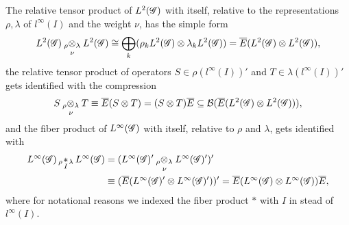 The relative tensor product of $L^{2}(\mathscr{G})$ with itself, relative to the
representations $\rho,\lambda$ of $l^{\infty}(I)$ and the weight
$\nu$, has the simple form
\begin{align*}
L^{2}(\mathscr{G}) \underset{\nu{}}{_{\rho}\otimes_{\lambda}} L^{2}(\mathscr{G}) \cong
  \bigoplus_{k} (\rho_{k}L^{2}(\mathscr{G}) \otimes \lambda_{k}L^{2}(\mathscr{G})) =
  \overline{E}(L^{2}(\mathscr{G}) \otimes L^{2}(\mathscr{G})),
\end{align*}
the relative tensor product of operators $S\in \rho(l^{\infty}(I))'$
and $T \in \lambda(l^{\infty}(I))'$ gets identified with the
compression
\begin{align*}
S \underset{\nu{}}{_{\rho}\otimes_{\lambda}} T \equiv
  \overline{E}(S \otimes
  T) = (S \otimes T)\overline{E} \subseteq {\cal B}(\overline{E}(L^{2}(\mathscr{G})
  \otimes L^{2}(\mathscr{G}))),
\end{align*}
and the fiber product of  $  L^{\infty}(\mathscr{G})$ with itself, relative to $\rho$
and $\lambda$,  gets identified with
\begin{align} \label{eq:vn-fiber}
  \begin{aligned}
    L^{\infty}(\mathscr{G}) \,{}_{\rho}\!\underset{I}{\ast}\,\!\!_{\lambda}\, L^{\infty}(\mathscr{G}) &= (L^{\infty}(\mathscr{G})' \underset{\nu{}}{_{\rho}\otimes_{\lambda}} L^{\infty}(\mathscr{G})')' \\ &\equiv
    (\overline{E}(L^{\infty}(\mathscr{G})' \otimes L^{\infty}(\mathscr{G})'))' = \overline{E}(L^{\infty}(\mathscr{G}) \otimes
    L^{\infty}(\mathscr{G}))\overline{E},
  \end{aligned}
\end{align} 
where for notational reasons we indexed the fiber product $*$ with $I$ in stead of $l^{\infty}(I)$.

